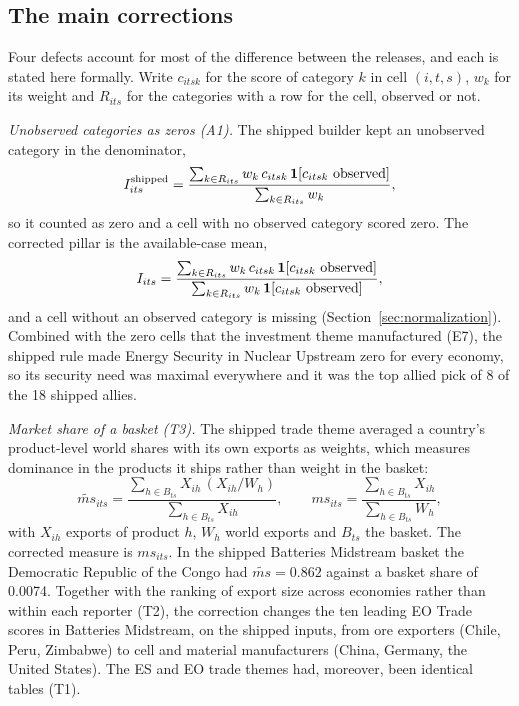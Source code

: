 \subsection{The main corrections}
\label{subsec:corr_defects}

Four defects account for most of the difference between the releases, and each is stated here
formally. Write $c_{itsk}$ for the score of category $k$ in cell $(i,t,s)$, $w_k$ for its weight and
$R_{its}$ for the categories with a row for the cell, observed or not.

\emph{Unobserved categories as zeros (A1).} The shipped builder kept an unobserved category in
the denominator,
\begin{equation}\label{eq:corr_pillar_old}
  I^{\text{shipped}}_{its}=\frac{\sum_{k\in R_{its}} w_k\,c_{itsk}\,\mathbf{1}[c_{itsk}\ \text{observed}]}
  {\sum_{k\in R_{its}} w_k},
\end{equation}
so it counted as zero and a cell with no observed category scored zero. The corrected pillar is the
available-case mean,
\begin{equation}\label{eq:corr_pillar_new}
  I_{its}=\frac{\sum_{k\in R_{its}} w_k\,c_{itsk}\,\1[c_{itsk}\ \text{observed}]}
  {\sum_{k\in R_{its}} w_k\,\1[c_{itsk}\ \text{observed}]},
\end{equation}
and a cell without an observed category is missing (Section~\ref{sec:normalization}). Combined with
the zero cells that the investment theme manufactured (E7), the shipped rule made Energy Security
in Nuclear Upstream zero for every economy, so its security need was maximal everywhere and it was
the top allied pick of 8 of the 18 shipped allies.

\emph{Market share of a basket (T3).} The shipped trade theme averaged a country's product-level
world shares with its own exports as weights, which measures dominance in the products it ships
rather than weight in the basket:
\begin{equation}\label{eq:corr_share_old}
  \widetilde{ms}_{its}=\frac{\sum_{h\in B_{ts}}X_{ih}\,(X_{ih}/W_h)}{\sum_{h\in B_{ts}}X_{ih}},
  \qquad
  ms_{its}=\frac{\sum_{h\in B_{ts}}X_{ih}}{\sum_{h\in B_{ts}}W_h},
\end{equation}
with $X_{ih}$ exports of product $h$, $W_h$ world exports and $B_{ts}$ the basket. The corrected
measure is $ms_{its}$. In the shipped Batteries Midstream basket the Democratic Republic of the
Congo had $\widetilde{ms}=0.862$ against a basket share of 0.0074. Together with the ranking of
export size across economies rather than within each reporter (T2), the correction changes the ten
leading EO Trade scores in Batteries Midstream, on the shipped inputs, from ore exporters (Chile,
Peru, Zimbabwe) to cell and material manufacturers (China, Germany, the United States). The ES and
EO trade themes had, moreover, been identical tables (T1).

